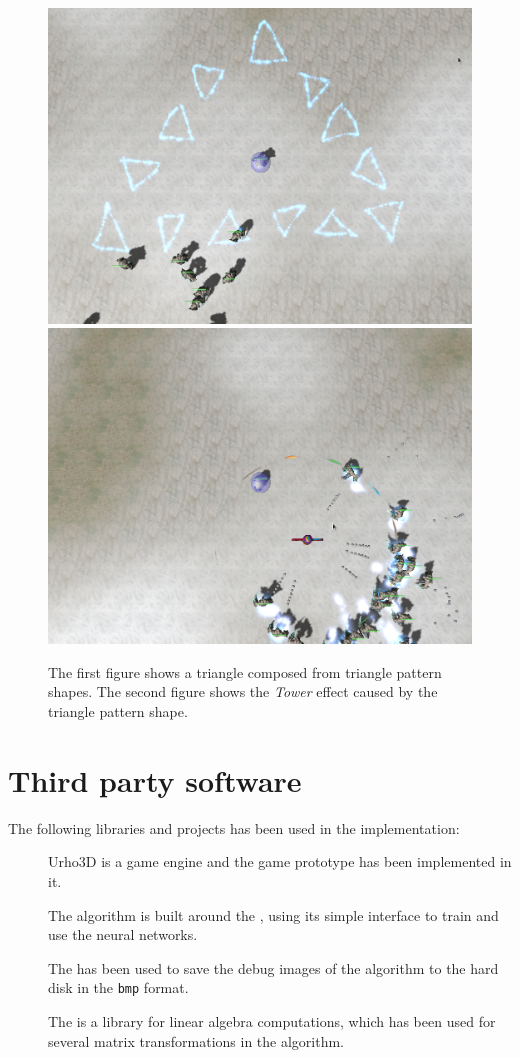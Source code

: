 \begin{figure}[p]
\centering
\includegraphics[width=.47\linewidth]{ext/scr/pattriangle.png}
\quad
\includegraphics[width=.47\linewidth]{ext/scr/pattrianglee.png}
\caption{The first figure shows a triangle composed from triangle pattern shapes. The second figure shows the \emph{Tower} effect caused by the triangle pattern shape. }
\label{fig:spell:pattriangle}
\end{figure}


\chapter{Third party software}
The following libraries and projects has been used in the implementation:
\begin{description}
	\item[\citet{urho}] Urho3D is a game engine and the game prototype has been implemented in it. 
	\item[\citet{fann}] The algorithm is built around the \citet{fann}, using its simple interface to train and use the neural networks.
	\item[\citet{bmp}] The \citet{bmp} has been used to save the debug images of the algorithm to the hard disk in the \texttt{bmp} format.
	\item[\citet{linalg}] The \citet{linalg} is a library for linear algebra computations, which has been used for several matrix transformations in the algorithm.
\end{description}